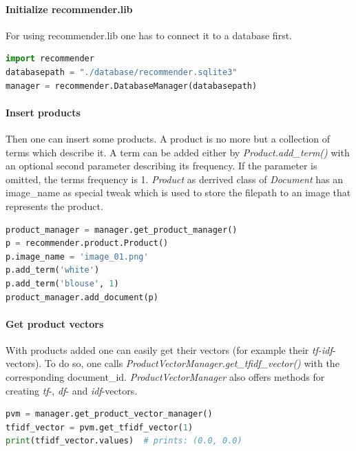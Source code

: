 \paragraph{Initialize recommender.lib}
For using recommender.lib one has to connect it to a database first.
\begin{lstlisting}[language=Python,caption={Startup of recommender.lib},label={lst:recommenderlib-startup}]
import recommender
databasepath = "./database/recommender.sqlite3"
manager = recommender.DatabaseManager(databasepath)
\end{lstlisting}

\paragraph{Insert products}
Then one can insert some products.
A product is no more but a collection of terms which describe it.
A term can be added either by \textit{Product.add\_term()} with an optional second parameter describing its frequency.
If the parameter is omitted, the terms frequency is 1.
\textit{Product} as derrived class of \textit{Document} has an image\_name as special tweak which is used to store the filepath to an image that represents the product.
\begin{lstlisting}[language=Python,caption={Insertion of products},label={lst:recommenderlib-product-insertion}]
product_manager = manager.get_product_manager()
p = recommender.product.Product()
p.image_name = 'image_01.png'
p.add_term('white')
p.add_term('blouse', 1)
product_manager.add_document(p)
\end{lstlisting}

\paragraph{Get product vectors}
With products added one can easily get their vectors (for example their \textit{tf-idf}-vectors).
To do so, one calls \textit{ProductVectorManager.get\_tfidf\_vector()} with the corresponding document\_id.
\textit{ProductVectorManager} also offers methods for creating \textit{tf}-, \textit{df}- and \textit{idf}-vectors.
\begin{lstlisting}[language=Python,caption={\textit{tf-idf} vector of a product},label={lst:recommenderlib-product-vector}]
pvm = manager.get_product_vector_manager()
tfidf_vector = pvm.get_tfidf_vector(1)
print(tfidf_vector.values)  # prints: (0.0, 0.0)
\end{lstlisting}

